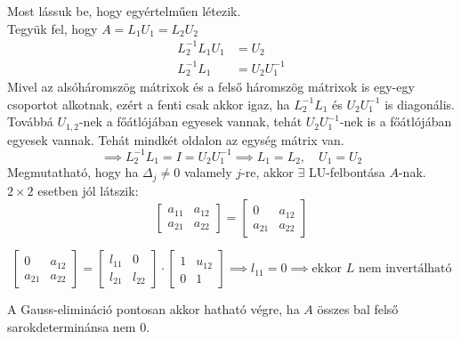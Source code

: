 Most lássuk be, hogy egyértelműen létezik. \\
Tegyük fel, hogy $A = L_{1}U_{1} = L_{2}U_{2}$
\begin{align*}
L_{2}^{-1}L_{1}U_{1} & = U_{2} \\
L_{2}^{-1}L_{1} & = U_{2}U_{1}^{-1}
\end{align*}
Mivel az alsóháromszög mátrixok és a felső háromszög mátrixok is egy-egy csoportot alkotnak, ezért a fenti csak akkor igaz, ha $L_{2}^{-1}L_{1}$ és $U_{2}U_{1}^{-1}$ is diagonális. Továbbá $U_{1, 2}$-nek a főátlójában egyesek vannak, tehát $U_{2}U_{1}^{-1}$-nek is a főátlójában egyesek vannak. Tehát mindkét oldalon az egység mátrix van.
$$
\implies L_{2}^{-1}L_{1} = I = U_{2}U_{1}^{-1} \implies L_{1} = L_{2}, \quad U_{1} = U_{2}
$$
Megmutatható, hogy ha $\Delta_{j} \neq 0$ valamely $j$-re, akkor $\exists$  LU-felbontása $A$-nak.
$2 \times 2$ esetben jól látszik:
\begin{equation*}
    \begin{bmatrix}
    a_{11} & a_{12} \\
    a_{21} & a_{22}
    \end{bmatrix}
    =
    \begin{bmatrix}
    0 & a_{12} \\
    a_{21} & a_{22}
    \end{bmatrix}
\end{equation*}

\begin{equation*}
    \begin{bmatrix}
    0 & a_{12} \\
    a_{21} & a_{22}
    \end{bmatrix}
    =
    \begin{bmatrix}
    l_{11} & 0 \\
    l_{21} & l_{22}
    \end{bmatrix}
    \cdot
    \begin{bmatrix}
    1 & u_{12} \\
    0 & 1
    \end{bmatrix}
    \implies l_{11} = 0 \implies \text{ekkor } L \text{ nem invertálható}
\end{equation*}

\begin{kov}
    A Gauss-elimináció pontosan akkor hatható végre, ha $A$ összes bal felső sarokdeterminánsa nem $0$.
\end{kov}

